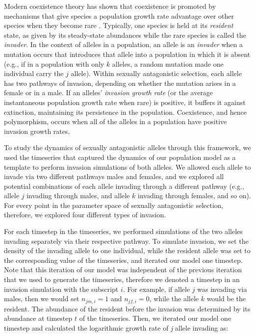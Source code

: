 \documentclass[12pt]{article}
\begin{document}
 Modern coexistence theory has shown that coexistence is promoted by mechanisms that give species a population growth rate advantage over other species when they become rare \citep{chesson_stabilizing_1982, chesson2003quantifying, barabas_chessons_2018}. Typically, one species is held at its \textit{resident} state, as given by its steady-state abundances while the rare species is called the \textit{invader}. In the context of alleles in a population, an allele is an \textit{invader} when a mutation occurs that introduces that allele into a population in which it is absent (e.g., if in a population with only $k$ alleles, a random mutation made one individual carry the $j$ allele). Within sexually antagonistic selection, each allele has two pathways of invasion, depending on whether the mutation arises in a female or in a male. If an alleles' \textit{invasion growth rate} (or the average instantaneous population growth rate when rare) is positive, it buffers it against extinction, maintaining its persistence in the population.  Coexistence, and hence polymorphism, occurs when all of the alleles in a population have positive invasion growth rates.

To study the dynamics of sexually antagonistic alleles through this framework, we used the timeseries that captured the dynamics of our population model as a template to perform invasion simulations of both alleles. We allowed each allele to invade via two different pathways males and females, and we explored all potential combinations of each allele invading through a different pathway (e.g., allele $j$ invading through males, and allele $k$ invading through females, and so on). For every point in the parameter space of sexually antagonistic selection, therefore, we explored four different types of invasion.

For each timestep in the timeseries, we performed simulations of the two alleles invading separately via their respective pathway. To simulate invasion, we set the density of the invading allele to one individual, while the resident allele was set to the corresponding value of the timeseries, and iterated our model one timestep. Note that this iteration of our model was independent of the previous iteration that we used to generate the timeseries, therefore we denoted a timestep in an invasion simulation with the subscript $i$. For example, if allele $j$ was invading via males, then we would set $n_{jm,i} = 1$ and $n_{jf,i}= 0$, while the allele $k$ would be the resident. The abundance of the resident before the invasion was determined by its abundance at timestep $t$ of the timeseries. Then, we iterated our model one timestep and calculated the logarithmic growth rate of \textit{j} allele invading as:
\end{document}
